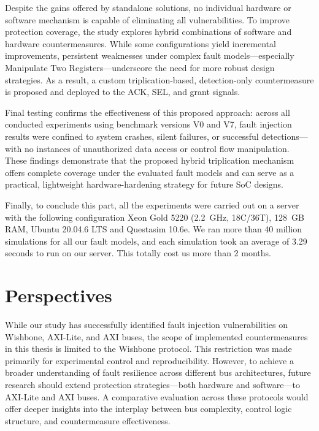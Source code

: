 Despite the gains offered by standalone solutions, no individual hardware or software mechanism is capable of eliminating all vulnerabilities. To improve protection coverage, the study explores hybrid combinations of software and hardware countermeasures. While some configurations yield incremental improvements, persistent weaknesses under complex fault models—especially Manipulate Two Registers—underscore the need for more robust design strategies. As a result, a custom triplication-based, detection-only countermeasure is proposed and deployed to the ACK, SEL, and grant signals.

Final testing confirms the effectiveness of this proposed approach: across all conducted experiments using benchmark versions V0 and V7, fault injection results were confined to system crashes, silent failures, or successful detections—with no instances of unauthorized data access or control flow manipulation. These findings demonstrate that the proposed hybrid triplication mechanism offers complete coverage under the evaluated fault models and can serve as a practical, lightweight hardware-hardening strategy for future SoC designs.

Finally, to conclude this part, all the experiments were carried out on a server with the following configuration Xeon Gold 5220 (2.2~GHz, 18C/36T), 128~GB RAM, Ubuntu 20.04.6 LTS and Questasim 10.6e. We ran more than 40 million simulations for all our fault models, and each simulation took an average of 3.29 seconds to run on our server. This totally cost us more than 2 months.

\section{Perspectives}

While our study has successfully identified fault injection vulnerabilities on Wishbone, AXI-Lite, and AXI buses, the scope of implemented countermeasures in this thesis is limited to the Wishbone protocol. This restriction was made primarily for experimental control and reproducibility. However, to achieve a broader understanding of fault resilience across different bus architectures, future research should extend protection strategies—both hardware and software—to AXI-Lite and AXI buses. A comparative evaluation across these protocols would offer deeper insights into the interplay between bus complexity, control logic structure, and countermeasure effectiveness.

